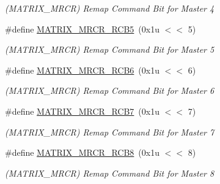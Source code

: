 \begin{DoxyCompactItemize}
\begin{DoxyCompactList}\small\item\em (M\+A\+T\+R\+I\+X\+\_\+\+M\+R\+CR) Remap Command Bit for Master 4 \end{DoxyCompactList}\item 
\mbox{\label{group__SAMV71__MATRIX_ga6cd4d938e52347adefdb0a875206d229}} 
\#define \mbox{\hyperlink{group__SAMV71__MATRIX_ga6cd4d938e52347adefdb0a875206d229}{M\+A\+T\+R\+I\+X\+\_\+\+M\+R\+C\+R\+\_\+\+R\+C\+B5}}~(0x1u $<$$<$ 5)
\begin{DoxyCompactList}\small\item\em (M\+A\+T\+R\+I\+X\+\_\+\+M\+R\+CR) Remap Command Bit for Master 5 \end{DoxyCompactList}\item 
\mbox{\label{group__SAMV71__MATRIX_ga8fd30af2c60b0722e6448e99b793d0d6}} 
\#define \mbox{\hyperlink{group__SAMV71__MATRIX_ga8fd30af2c60b0722e6448e99b793d0d6}{M\+A\+T\+R\+I\+X\+\_\+\+M\+R\+C\+R\+\_\+\+R\+C\+B6}}~(0x1u $<$$<$ 6)
\begin{DoxyCompactList}\small\item\em (M\+A\+T\+R\+I\+X\+\_\+\+M\+R\+CR) Remap Command Bit for Master 6 \end{DoxyCompactList}\item 
\mbox{\label{group__SAMV71__MATRIX_ga8e5fed00c5e38057e5a2fab8562bccc9}} 
\#define \mbox{\hyperlink{group__SAMV71__MATRIX_ga8e5fed00c5e38057e5a2fab8562bccc9}{M\+A\+T\+R\+I\+X\+\_\+\+M\+R\+C\+R\+\_\+\+R\+C\+B7}}~(0x1u $<$$<$ 7)
\begin{DoxyCompactList}\small\item\em (M\+A\+T\+R\+I\+X\+\_\+\+M\+R\+CR) Remap Command Bit for Master 7 \end{DoxyCompactList}\item 
\mbox{\label{group__SAMV71__MATRIX_gad0bf8066b69cd6cd777ff6b5117ef108}} 
\#define \mbox{\hyperlink{group__SAMV71__MATRIX_gad0bf8066b69cd6cd777ff6b5117ef108}{M\+A\+T\+R\+I\+X\+\_\+\+M\+R\+C\+R\+\_\+\+R\+C\+B8}}~(0x1u $<$$<$ 8)
\begin{DoxyCompactList}\small\item\em (M\+A\+T\+R\+I\+X\+\_\+\+M\+R\+CR) Remap Command Bit for Master 8 \end{DoxyCompactList}\item 

\end{DoxyCompactItemize}
